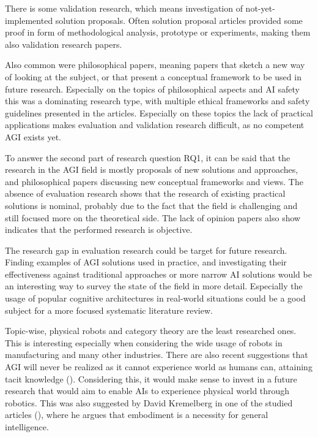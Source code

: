 \documentclass[utf8,english]{gradu3}
\begin{document}
There is some validation research, which means investigation of
not-yet-implemented solution proposals. Often solution proposal articles
provided some proof in form of methodological analysis, prototype or
experiments, making them also validation research papers.

Also common were philosophical papers, meaning papers that sketch a new way of
looking at the subject, or that present a conceptual framework to be used in
future research. Especially on the topics of philosophical aspects and AI safety
this was a dominating research type, with multiple ethical frameworks and safety
guidelines presented in the articles. Especially on these topics the lack of
practical applications makes evaluation and validation research difficult, as no
competent AGI exists yet.

To answer the second part of research question RQ1, it can be said that the
research in the AGI field is mostly proposals of new solutions and approaches,
and philosophical papers discussing new conceptual frameworks and views. The
absence of evaluation research shows that the research of existing practical
solutions is nominal, probably due to the fact that the field is challenging and
still focused more on the theoretical side. The lack of opinion papers
also show indicates that the performed research is objective.

The research gap in evaluation research could be target for future research.
Finding examples of AGI solutions used in practice, and investigating their
effectiveness against traditional approaches or more narrow AI solutions would
be an interesting way to survey the state of the field in more detail.
Especially the usage of popular cognitive architectures in real-world situations
could be a good subject for a more focused systematic literature review. 

Topic-wise, physical robots and category theory are the least researched ones.
This is interesting especially when considering the wide usage of robots in
manufacturing and many other industries. There are also recent suggestions that
AGI will never be realized as it cannot experience world as humans can,
attaining tacit knowledge (\cite{fjelland2020why}). Considering this, it would
make sense to invest in a future research that would aim to enable AIs to
experience physical world through robotics. This was also suggested by David
Kremelberg in one of the studied articles (\cite{kremelberg2019embodiment}),
where he argues that embodiment is a necessity for general intelligence.
\end{document}
